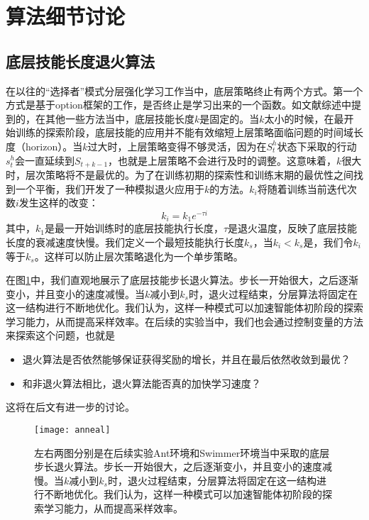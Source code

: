 \section{算法细节讨论}
\subsection{底层技能长度退火算法}
在以往的``选择者''模式分层强化学习工作当中，底层策略终止有两个方式。第一个方式是基于option框架的工作，是否终止是学习出来的一个函数。如文献综述中提到的，在其他一些方法当中\cite{SNN4hrl, MLSH,HAC}，底层技能长度$k$是固定的。当$k$太小的时候，在最开始训练的探索阶段，底层技能的应用并不能有效缩短上层策略面临问题的时间域长度（horizon）。当$k$过大时，上层策略变得不够灵活，因为在$S_t^h$状态下采取的行动$s_t^h$会一直延续到$S_{t+k-1}$，也就是上层策略不会进行及时的调整。这意味着，$k$很大时，层次策略将不是最优的。为了在训练初期的探索性和训练末期的最优性之间找到一个平衡，我们开发了一种模拟退火应用于$k$的方法。$k_i$将随着训练当前迭代次数$i$发生这样的改变：
    $$k_i=k_1 e^{-\tau i}$$
	其中，$k_1$是最一开始训练时的底层技能执行长度，$\tau$是退火温度，反映了底层技能长度的衰减速度快慢。我们定义一个最短技能执行长度$k_s$，当$k_i < k_s$是，我们令$k_i$等于$k_s$。这样可以防止层次策略退化为一个单步策略。
	
	在图\ref{fig:anneal}中，我们直观地展示了底层技能步长退火算法。步长一开始很大，之后逐渐变小，并且变小的速度减慢。当$k$减小到$k_s$时，退火过程结束，分层算法将固定在这一结构进行不断地优化。我们认为，这样一种模式可以加速智能体初阶段的探索学习能力，从而提高采样效率。在后续的实验当中，我们也会通过控制变量的方法来探索这个问题，也就是
	\begin{itemize}
	  \item 退火算法是否依然能够保证获得奖励的增长，并且在最后依然收敛到最优？
	  \item 和非退火算法相比，退火算法能否真的加快学习速度？
	\end{itemize}
	这将在后文有进一步的讨论。
	
	\begin{figure}[h] %
        \centering
        \texttt{[image: anneal]}
        \caption{左右两图分别是在后续实验Ant环境和Swimmer环境当中采取的底层步长退火算法。步长一开始很大，之后逐渐变小，并且变小的速度减慢。当$k$减小到$k_s$时，退火过程结束，分层算法将固定在这一结构进行不断地优化。我们认为，这样一种模式可以加速智能体初阶段的探索学习能力，从而提高采样效率。}
        \label{fig:anneal}
    \end{figure}
	

